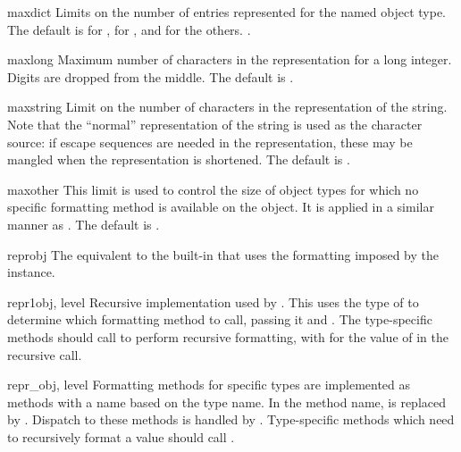 \begin{memberdesc}{maxdict}
  Limits on the number of entries represented for the named object
  type.  The default is  for ,  for
  , and   for the others.
  .
\end{memberdesc}

\begin{memberdesc}{maxlong}
  Maximum number of characters in the representation for a long
  integer.  Digits are dropped from the middle.  The default is
  .
\end{memberdesc}

\begin{memberdesc}{maxstring}
  Limit on the number of characters in the representation of the
  string.  Note that the ``normal'' representation of the string is
  used as the character source: if escape sequences are needed in the
  representation, these may be mangled when the representation is
  shortened.  The default is .
\end{memberdesc}

\begin{memberdesc}{maxother}
  This limit is used to control the size of object types for which no
  specific formatting method is available on the  object.
  It is applied in a similar manner as .  The
  default is .
\end{memberdesc}

\begin{methoddesc}{repr}{obj}
  The equivalent to the built-in  that uses the
  formatting imposed by the instance.
\end{methoddesc}

\begin{methoddesc}{repr1}{obj, level}
  Recursive implementation used by .  This uses the
  type of  to determine which formatting method to call,
  passing it  and .  The type-specific methods
  should call  to perform recursive formatting, with
   for the value of  in the recursive 
  call.
\end{methoddesc}

\begin{methoddescni}{repr_}{obj, level}
  Formatting methods for specific types are implemented as methods
  with a name based on the type name.  In the method name, 
  is replaced by
  .
  Dispatch to these methods is handled by .
  Type-specific methods which need to recursively format a value
  should call .
\end{methoddescni}


